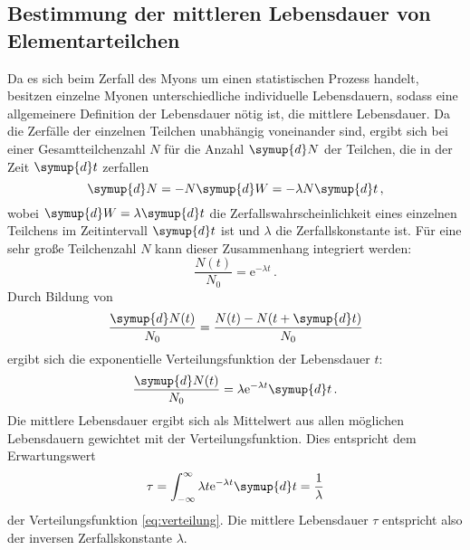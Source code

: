 \subsection{Bestimmung der mittleren Lebensdauer von Elementarteilchen}
Da es sich beim Zerfall des Myons um einen statistischen Prozess handelt, besitzen einzelne Myonen unterschiedliche individuelle Lebensdauern,
sodass eine allgemeinere Definition der Lebensdauer nötig ist, die mittlere Lebensdauer. Da die Zerfälle der einzelnen Teilchen unabhängig voneinander sind,
ergibt sich bei einer Gesamtteilchenzahl $N$ für die Anzahl $\symup{d}N$ der Teilchen, die in der Zeit $\symup{d}t$ zerfallen
\begin{equation}
  \symup{d}N = -N\symup{d}W = -\lambda N\symup{d}t \,,
\end{equation}
wobei $\symup{d}W = \lambda\symup{d}t$ die Zerfallswahrscheinlichkeit eines einzelnen Teilchens im Zeitintervall $\symup{d}t$ ist und $\lambda$ die Zerfallskonstante ist.
Für eine sehr große Teilchenzahl $N$ kann dieser Zusammenhang integriert werden:
\begin{equation}
  \frac{N(t)}{N_0} = \text{e}^{-\lambda t} \,.
\end{equation}
Durch Bildung von
\begin{equation*}
  \frac{\symup{d}N(t)}{N_0} = \frac{N(t) - N(t+\symup{d}t)}{N_0}
\end{equation*}
ergibt sich die exponentielle Verteilungsfunktion der Lebensdauer $t$:
\begin{equation}
  \frac{\symup{d}N(t)}{N_0} = \lambda\text{e}^{-\lambda t}\symup{d}t\,.
  \label{eq:verteilung}
\end{equation}
Die mittlere Lebensdauer ergibt sich als Mittelwert aus allen möglichen Lebensdauern gewichtet mit der Verteilungsfunktion. Dies entspricht dem Erwartungswert
\begin{equation}
  \tau = \int_{-\infty}^\infty \lambda t \text{e}^{-\lambda t} \symup{d}t = \frac{1}{\lambda}
\end{equation}
der Verteilungsfunktion \eqref{eq:verteilung}. Die mittlere Lebensdauer $\tau$ entspricht also der inversen Zerfallskonstante $\lambda$.
